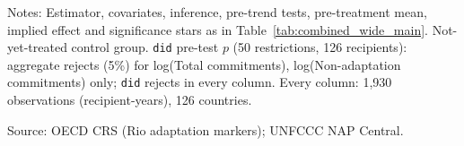 \begin{table}[H]
\centering
\caption{Effect of NAP adoption on climate finance: simple ATT across outcomes (not-yet-treated controls, multiplier-bootstrap SE)}
\label{tab:combined_wide_notyettreated}
\begingroup\small
{}
\endgroup
\par\vspace{4pt}
\begin{minipage}{\linewidth}\footnotesize
Notes: Estimator, covariates, inference, pre-trend tests, pre-treatment mean, implied effect and significance stars as in Table~\ref{tab:combined_wide_main}. Not-yet-treated control group. \texttt{did} pre-test $p$ (50 restrictions, 126 recipients): aggregate rejects (5\%) for log(Total commitments), log(Non-adaptation commitments) only; \texttt{did} rejects in every column. Every column: 1,930 observations (recipient-years), 126 countries.\par
Source: OECD CRS (Rio adaptation markers); UNFCCC NAP Central.
\end{minipage}
\end{table}

